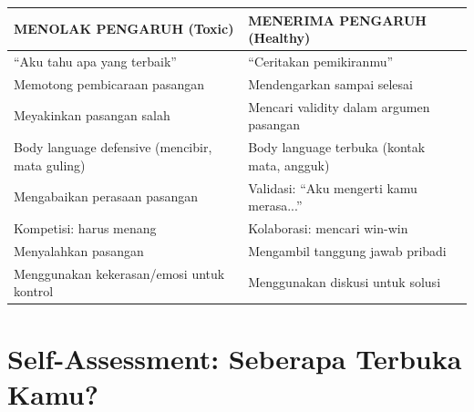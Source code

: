 \begin{center}
\renewcommand{\arraystretch}{1.6}
\begin{tabular}{|>{\raggedright}p{6cm}|>{\raggedright\arraybackslash}p{7cm}|}
\hline
\rowcolor{primary!20}
\textbf{MENOLAK PENGARUH (Toxic)} & \textbf{MENERIMA PENGARUH (Healthy)} \\
\hline
``Aku tahu apa yang terbaik'' & ``Ceritakan pemikiranmu'' \\
\hline
Memotong pembicaraan pasangan & Mendengarkan sampai selesai \\
\hline
Meyakinkan pasangan salah & Mencari validity dalam argumen pasangan \\
\hline
Body language defensive (mencibir, mata guling) & Body language terbuka (kontak mata, angguk) \\
\hline
Mengabaikan perasaan pasangan & Validasi: ``Aku mengerti kamu merasa...'' \\
\hline
Kompetisi: harus menang & Kolaborasi: mencari win-win \\
\hline
Menyalahkan pasangan & Mengambil tanggung jawab pribadi \\
\hline
Menggunakan kekerasan/emosi untuk kontrol & Menggunakan diskusi untuk solusi \\
\hline
\end{tabular}
\end{center}

\section{Self-Assessment: Seberapa Terbuka Kamu?}

